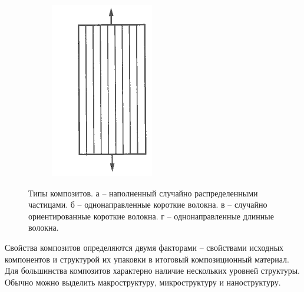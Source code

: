 \begin{figure}[h]
\begin{subfigure}[b]{0.2\textwidth}
\includegraphics[width=\textwidth]{png/composites-types-4.png}
\caption{ }
\end{subfigure}
\caption{Типы композитов. а -- наполненный случайно распределенными частицами. б -- однонаправленные короткие волокна. в -- случайно ориентированные короткие волокна. г -- однонаправленные длинные волокна.}
\label{pic:composite-types}
\end{figure}

Свойства композитов определяются двумя факторами -- свойствами исходных компонентов и структурой их упаковки в итоговый композиционный материал. Для большинства композитов характерно наличие нескольких уровней структуры. Обычно можно выделить макроструктуру, микроструктуру и наноструктуру.

